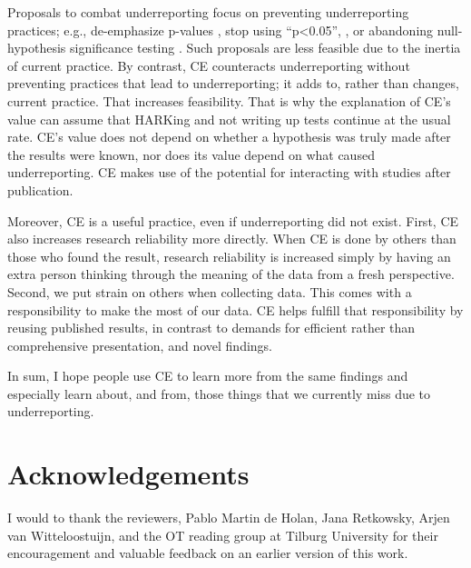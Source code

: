 \documentclass[authordate, meta,issue]{jote-new-article}
\begin{document}
Proposals to combat underreporting focus on preventing underreporting practices; e.g., de-emphasize p-values \parencite{Bettis2012}, stop using “p<0.05”, \parencite{Bettis2012, Wasserstein2019}, or abandoning null-hypothesis significance testing \parencite{Schwab2011}. Such proposals are less feasible due to the inertia of current practice. By contrast, CE counteracts underreporting without preventing practices that lead to underreporting; it adds to, rather than changes, current practice. That increases feasibility. That is why the explanation of CE’s value can assume that HARKing and not writing up tests continue at the usual rate. CE’s value does not depend on whether a hypothesis was truly made after the results were known, nor does its value depend on what caused underreporting. CE makes use of the potential for interacting with studies after publication.

Moreover, CE is a useful practice, even if underreporting did not exist. First, CE also increases research reliability more directly. When CE is done by others than those who found the result, research reliability is increased simply by having an extra person thinking through the meaning of the data from a fresh perspective. Second, we put strain on others when collecting data. This comes with a responsibility to make the most of our data. CE helps fulfill that responsibility by reusing published results, in contrast to demands for efficient rather than comprehensive presentation, and novel findings.

In sum, I hope people use CE to learn more from the same findings and especially learn about, and from, those things that we currently miss due to underreporting.



\section{Acknowledgements}

I would to thank the reviewers, Pablo Martin de Holan, Jana Retkowsky, Arjen van Witteloostuijn, and the OT reading group at Tilburg University for their encouragement and valuable feedback on an earlier version of this work.



\printbibliography
\end{document}
